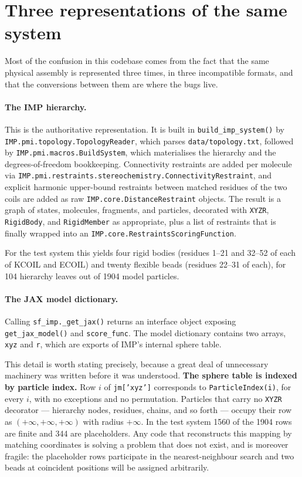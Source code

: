 \documentclass[11pt]{article}
\newcommand{\code}[1]{\texttt{#1}}
\begin{document}
\section{Three representations of the same system}

Most of the confusion in this codebase comes from the fact that the same
physical assembly is represented three times, in three incompatible formats,
and that the conversions between them are where the bugs live.

\paragraph{The IMP hierarchy.}
This is the authoritative representation. It is built in
\code{build\_imp\_system()} by \code{IMP.pmi.topology.TopologyReader}, which
parses \code{data/topology.txt}, followed by
\code{IMP.pmi.macros.BuildSystem}, which materialises the hierarchy and the
degrees-of-freedom bookkeeping. Connectivity restraints are added per molecule
via \code{IMP.pmi.restraints.stereochemistry.ConnectivityRestraint}, and
explicit harmonic upper-bound restraints between matched residues of the two
coils are added as raw \code{IMP.core.DistanceRestraint} objects. The result is
a graph of states, molecules, fragments, and particles, decorated with
\code{XYZR}, \code{RigidBody}, and \code{RigidMember} as appropriate, plus a
list of restraints that is finally wrapped into an
\code{IMP.core.RestraintsScoringFunction}.

For the test system this yields four rigid bodies (residues 1--21 and 32--52 of
each of KCOIL and ECOIL) and twenty flexible beads (residues 22--31 of each),
for 104 hierarchy leaves out of 1904 model particles.

\paragraph{The JAX model dictionary.}
Calling \code{sf\_imp.\_get\_jax()} returns an interface object exposing
\code{get\_jax\_model()} and \code{score\_func}. The model dictionary contains
two arrays, \code{xyz} and \code{r}, which are exports of IMP's internal sphere
table.

This detail is worth stating precisely, because a great deal of unnecessary
machinery was written before it was understood. \textbf{The sphere table is
indexed by particle index.} Row $i$ of \code{jm['xyz']} corresponds to
\code{ParticleIndex(i)}, for every $i$, with no exceptions and no permutation.
Particles that carry no \code{XYZR} decorator --- hierarchy nodes, residues,
chains, and so forth --- occupy their row as $(+\infty,+\infty,+\infty)$ with
radius $+\infty$. In the test system 1560 of the 1904 rows are finite and 344
are placeholders. Any code that reconstructs this mapping by matching
coordinates is solving a problem that does not exist, and is moreover fragile:
the placeholder rows participate in the nearest-neighbour search and two beads
at coincident positions will be assigned arbitrarily.
\end{document}
